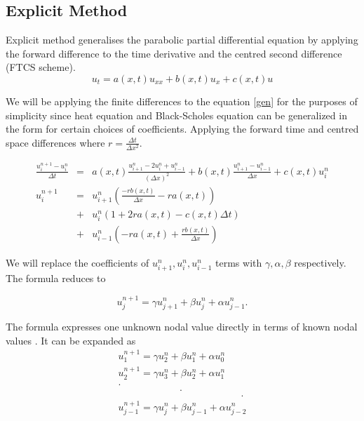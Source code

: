 \documentclass[12pt, oneside]{book}
\theoremstyle{plain}
\theoremstyle{definition}
\begin{document}
\subsection{Explicit Method}
Explicit method generalises the parabolic partial differential equation by applying the forward difference to the time derivative and the centred second difference (FTCS scheme).
\begin{equation} \label{gen}
 u_t = a(x, t)  u_{xx} + b(x, t) u_x + c(x, t) u
\end{equation}

We will be applying the finite differences to the equation  \ref{gen}  for the purposes of simplicity since heat equation and Black-Scholes equation can be generalized in the form for certain choices of coefficients. Applying the forward time and centred space differences where $ r = \frac{\Delta t}{\Delta x^2} $.

\begin{eqnarray*}
\frac{u^{n+1}_i - u^n_i}{\Delta t} &=& a(x, t)  \frac{u^n_{i+1}- 2u^n_i + u^n_{i-1}}{(\Delta x)^2}  + b(x, t)  \frac{u^{n}_{i+1} - u^{n}_{i-1}}{\Delta x} + c(x, t) u^n_i \\
u^{n+1}_i &=& u^n_{i + 1} (\frac{-r b(x, t)}{\Delta x} - r a(x, t))\\
&+& u^n_{i}(1 + 2 r a(x, t) - c(x, t) \Delta t) \\
&+& u^n_{i - 1} (-r a(x, t) + \frac{r b(x, t)}{\Delta x})
\end{eqnarray*}


We will replace the coefficients of $ u^n_{i + 1},  u^n_i,  u^n_{i - 1}$  terms with $\gamma,  \alpha, \beta$ respectively. The formula reduces to

\begin{equation}
u_j^{n+1} = \gamma u_{j+1}^{n} + \beta u_{j}^{n} + \alpha u_{j-1}^{n} .
\end{equation}

The formula expresses one unknown nodal value directly in terms of known nodal values  \cite{evans}. It can be expanded as
\begin{multline}
u_1^{n+1} = \gamma u_{2}^{n} + \beta u_{1}^{n} + \alpha u_{0}^{n} \\
u_2^{n+1} = \gamma u_{3}^{n} + \beta u_{2}^{n} + \alpha u_{1}^{n} \\
.\\
\hspace{75pt} .\\
\hspace{150pt} .\\
u_{j-1}^{n+1} = \gamma u_{j}^{n} + \beta u_{j-1}^{n} + \alpha u_{j-2}^{n} 
\end{multline}
\end{document}
